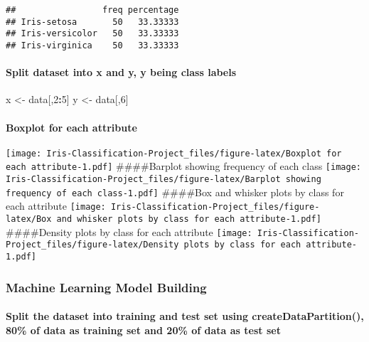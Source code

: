 \documentclass[]{article}
\newenvironment{Shaded}{\begin{snugshade}}{\end{snugshade}}
\newcommand{\DecValTok}[1]{\textcolor[rgb]{0.00,0.00,0.81}{#1}}
\newcommand{\StringTok}[1]{\textcolor[rgb]{0.31,0.60,0.02}{#1}}
\newcommand{\OperatorTok}[1]{\textcolor[rgb]{0.81,0.36,0.00}{\textbf{#1}}}
\newcommand{\NormalTok}[1]{#1}
\let\oldparagraph\paragraph
\renewcommand{\paragraph}[1]{\oldparagraph{#1}\mbox{}}
\begin{document}
\begin{verbatim}
##                 freq percentage
## Iris-setosa       50   33.33333
## Iris-versicolor   50   33.33333
## Iris-virginica    50   33.33333
\end{verbatim}

\paragraph{Split dataset into x and y, y being class
labels}\label{split-dataset-into-x-and-y-y-being-class-labels}

\begin{Shaded}
\begin{Highlighting}[]
\NormalTok{x <-}\StringTok{ }\NormalTok{data[,}\DecValTok{2}\OperatorTok{:}\DecValTok{5}\NormalTok{]}
\NormalTok{y <-}\StringTok{ }\NormalTok{data[,}\DecValTok{6}\NormalTok{]}
\end{Highlighting}
\end{Shaded}

\paragraph{Boxplot for each attribute}\label{boxplot-for-each-attribute}

\texttt{[image: Iris-Classification-Project\_files/figure-latex/Boxplot for each attribute-1.pdf]}
\#\#\#\#Barplot showing frequency of each class
\texttt{[image: Iris-Classification-Project\_files/figure-latex/Barplot showing frequency of each class-1.pdf]}
\#\#\#\#Box and whisker plots by class for each attribute
\texttt{[image: Iris-Classification-Project\_files/figure-latex/Box and whisker plots by class for each attribute-1.pdf]}
\#\#\#\#Density plots by class for each attribute
\texttt{[image: Iris-Classification-Project\_files/figure-latex/Density plots by class for each attribute-1.pdf]}

\subsubsection{Machine Learning Model
Building}\label{machine-learning-model-building}

\paragraph{Split the dataset into training and test set using
createDataPartition(), 80\% of data as training set and 20\% of data as
test
set}\label{split-the-dataset-into-training-and-test-set-using-createdatapartition-80-of-data-as-training-set-and-20-of-data-as-test-set}
\end{document}
